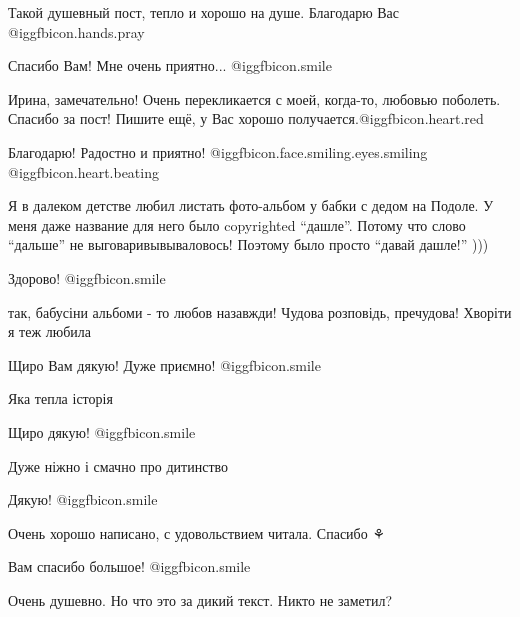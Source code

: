  
 
 
 
 
\zzSecCmt

\begin{itemize} %
Такой душевный пост, тепло и хорошо на душе. Благодарю Вас  @igg{fbicon.hands.pray} 

Спасибо Вам! Мне очень приятно... @igg{fbicon.smile} 

Ирина, замечательно! Очень перекликается с моей, когда-то, любовью поболеть.
Спасибо за пост! Пишите ещё, у Вас хорошо получается.@igg{fbicon.heart.red}

Благодарю! Радостно и приятно! @igg{fbicon.face.smiling.eyes.smiling}  @igg{fbicon.heart.beating} 


Я в далеком детстве любил листать фото-альбом у бабки с дедом на Подоле. У меня
даже название для него было copyrighted \enquote{дашле}. Потому что слово \enquote{дальше} не
выговаривывываловось! Поэтому было просто \enquote{давай дашле!} )))

Здорово!  @igg{fbicon.smile} 

так, бабусіни альбоми - то любов назавжди! Чудова розповідь, пречудова! Хворіти я теж любила

Щиро Вам дякую! Дуже приємно! @igg{fbicon.smile} 

Яка тепла історія

Щиро дякую! @igg{fbicon.smile} 

Дуже ніжно і смачно про дитинство

Дякую! @igg{fbicon.smile} 

Очень хорошо написано, с удовольствием читала. Спасибо ⚘

Вам спасибо большое! @igg{fbicon.smile} 

Очень душевно. Но что это за дикий текст. Никто не заметил?


\end{itemize}
